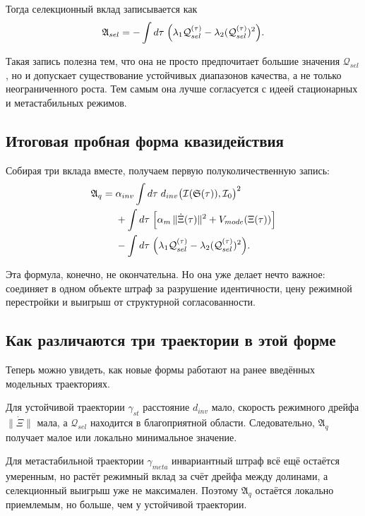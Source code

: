 \documentclass[12pt,a4paper]{article}
\begin{document}
Тогда селекционный вклад записывается как
\begin{equation}
\mathfrak{A}_{sel}=-\int d\tau\;\Bigl(\lambda_1\mathcal{Q}_{sel}^{(\tau)}-\lambda_2(\mathcal{Q}_{sel}^{(\tau)})^2\Bigr).
\end{equation}

Такая запись полезна тем, что она не просто предпочитает большие значения \(\mathcal{Q}_{sel}\), но и допускает существование устойчивых диапазонов качества, а не только неограниченного роста. Тем самым она лучше согласуется с идеей стационарных и метастабильных режимов.

\subsection{Итоговая пробная форма квазидействия}

Собирая три вклада вместе, получаем первую полуколичественную запись:
\begin{align}
\mathfrak{A}_{q}
= {} & \alpha_{inv}\int d\tau\; d_{inv}\bigl(\mathcal{I}(\mathfrak{S}(\tau)),\mathcal{I}_0\bigr)^2 \\
& + \int d\tau\;\Bigl[\alpha_{m}\,\|\dot{\Xi}(\tau)\|^2 + V_{mode}(\Xi(\tau))\Bigr] \\
& - \int d\tau\;\Bigl(\lambda_1\mathcal{Q}_{sel}^{(\tau)}-\lambda_2(\mathcal{Q}_{sel}^{(\tau)})^2\Bigr).
\end{align}

Эта формула, конечно, не окончательна. Но она уже делает нечто важное: соединяет в одном объекте штраф за разрушение идентичности, цену режимной перестройки и выигрыш от структурной согласованности.

\subsection{Как различаются три траектории в этой форме}

Теперь можно увидеть, как новые формы работают на ранее введённых модельных траекториях.

Для устойчивой траектории \(\gamma_{st}\) расстояние \(d_{inv}\) мало, скорость режимного дрейфа \(\|\dot{\Xi}\|\) мала, а \(\mathcal{Q}_{sel}\) находится в благоприятной области. Следовательно, \(\mathfrak{A}_{q}\) получает малое или локально минимальное значение.

Для метастабильной траектории \(\gamma_{meta}\) инвариантный штраф всё ещё остаётся умеренным, но растёт режимный вклад за счёт дрейфа между долинами, а селекционный выигрыш уже не максимален. Поэтому \(\mathfrak{A}_{q}\) остаётся локально приемлемым, но больше, чем у устойчивой траектории.
\end{document}
